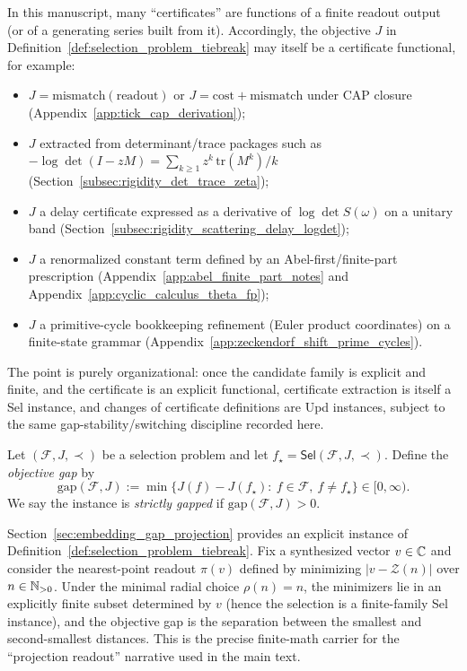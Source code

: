 \begin{remark}\label{rem:certificates_as_objectives}
\AuditTag In this manuscript, many ``certificates'' are functions of a finite readout output (or of a generating series built from it).
Accordingly, the objective $J$ in Definition~\ref{def:selection_problem_tiebreak} may itself be a certificate functional, for example:
\begin{itemize}
\item $J=\text{mismatch}(\text{readout})$ or $J=\text{cost}+\text{mismatch}$ under CAP closure (Appendix~\ref{app:tick_cap_derivation});
\item $J$ extracted from determinant/trace packages such as $-\log\det(I-zM)=\sum_{k\ge 1} z^k\,\mathrm{tr}(M^k)/k$ (Section~\ref{subsec:rigidity_det_trace_zeta});
\item $J$ a delay certificate expressed as a derivative of $\log\det S(\omega)$ on a unitary band (Section~\ref{subsec:rigidity_scattering_delay_logdet});
\item $J$ a renormalized constant term defined by an Abel-first/finite-part prescription (Appendix~\ref{app:abel_finite_part_notes} and Appendix~\ref{app:cyclic_calculus_theta_fp});
\item $J$ a primitive-cycle bookkeeping refinement (Euler product coordinates) on a finite-state grammar (Appendix~\ref{app:zeckendorf_shift_prime_cycles}).
\end{itemize}
\AuditTag The point is purely organizational: once the candidate family is explicit and finite, and the certificate is an explicit functional,
certificate extraction is itself a Sel instance, and changes of certificate definitions are Upd instances, subject to the same gap-stability/switching discipline recorded here.
\end{remark}

\begin{definition}\label{def:objective_gap}
Let $(\mathcal{F},J,\prec)$ be a selection problem and let $f_\star=\mathsf{Sel}(\mathcal{F},J,\prec)$.
Define the \emph{objective gap} by
\[
\mathrm{gap}(\mathcal{F},J):=\min\{J(f)-J(f_\star):\ f\in\mathcal{F},\ f\neq f_\star\}\in[0,\infty).
\]
We say the instance is \emph{strictly gapped} if $\mathrm{gap}(\mathcal{F},J)>0$.
\end{definition}

\begin{remark}
\label{rem:projection_readout_as_sel}
Section~\ref{sec:embedding_gap_projection} provides an explicit instance of Definition~\ref{def:selection_problem_tiebreak}.
Fix a synthesized vector $v\in\mathbb{C}$ and consider the nearest-point readout $\pi(v)$ defined by minimizing $|v-\mathcal{Z}(n)|$ over $n\in\mathbb{N}_{>0}$.
Under the minimal radial choice $\rho(n)=n$, the minimizers lie in an explicitly finite subset determined by $v$ (hence the selection is a finite-family Sel instance), and the objective gap is the separation between the smallest and second-smallest distances.
This is the precise finite-math carrier for the ``projection readout'' narrative used in the main text.
\end{remark}

